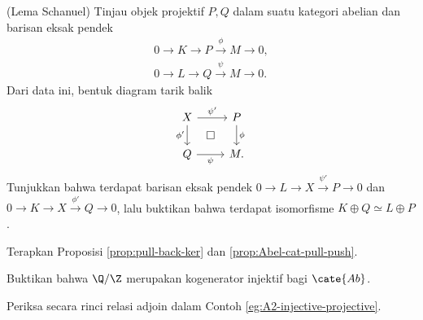 \begin{Exercises}
	\item (Lema Schanuel) Tinjau objek projektif $P,Q$ dalam suatu kategori
	abelian dan barisan eksak pendek
	\begin{gather*}
		0 \to K \to P \xrightarrow{\phi} M \to 0, \\
		0 \to L \to Q \xrightarrow{\psi} M \to 0.
	\end{gather*}
	Dari data ini, bentuk diagram tarik balik
	\[\begin{tikzcd}
		X \arrow[r, "{\psi'}"] \arrow[d, "{\phi'}"'] & P \arrow[d, "\phi"] \\
		Q \arrow[r, "\psi"'] & M \arrow[phantom, lu, "\Box" description] .
	\end{tikzcd}\]
	Tunjukkan bahwa terdapat barisan eksak pendek
	$0\to L\to X\xrightarrow{\psi'}P\to0$ dan
	$0\to K\to X\xrightarrow{\phi'}Q\to0$, lalu buktikan bahwa terdapat
	isomorfisme $K\oplus Q\simeq L\oplus P$.
	\begin{hint} Terapkan Proposisi \ref{prop:pull-back-ker} dan
	\ref{prop:Abel-cat-pull-push}. \end{hint}

	\item Buktikan bahwa $\Q/\Z$ merupakan kogenerator injektif bagi
	$\cate{Ab}$.

	\item Periksa secara rinci relasi adjoin dalam Contoh
	\ref{eg:A2-injective-projective}.


\end{Exercises}
